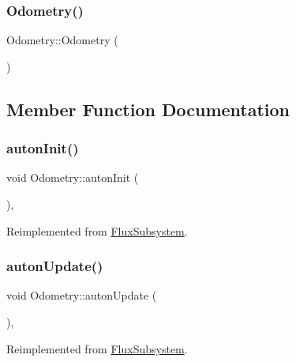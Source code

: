 \subsubsection{\texorpdfstring{Odometry()}{Odometry()}}
{\footnotesize\ttfamily Odometry\+::\+Odometry (\begin{DoxyParamCaption}{ }\end{DoxyParamCaption})}



\subsection{Member Function Documentation}
\mbox{\label{classOdometry_a0ec037096f65e779248e6a99615f37ed}} 
\subsubsection{\texorpdfstring{auton\+Init()}{autonInit()}}
{\footnotesize\ttfamily void Odometry\+::auton\+Init (\begin{DoxyParamCaption}{ }\end{DoxyParamCaption})\hspace{0.3cm}{\ttfamily [override]}, {\ttfamily [virtual]}}



Reimplemented from \hyperlink{classFluxSubsystem_a142cb34f612412e26bd0049e037dbe60}{Flux\+Subsystem}.

\mbox{\label{classOdometry_a5a19f4d904e5364ca75a91f97a8777a6}} 
\subsubsection{\texorpdfstring{auton\+Update()}{autonUpdate()}}
{\footnotesize\ttfamily void Odometry\+::auton\+Update (\begin{DoxyParamCaption}{ }\end{DoxyParamCaption})\hspace{0.3cm}{\ttfamily [override]}, {\ttfamily [virtual]}}



Reimplemented from \hyperlink{classFluxSubsystem_aceed900af22503022b8d1278f3693f77}{Flux\+Subsystem}.

